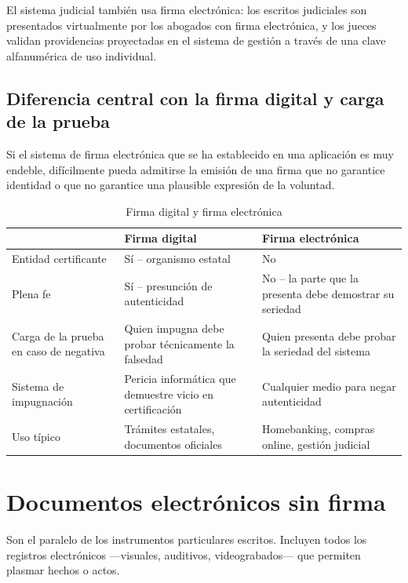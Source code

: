 \documentclass[12pt,oneside]{book}
\begin{document}
El sistema judicial también usa firma electrónica: los escritos judiciales son presentados virtualmente por los abogados con firma electrónica, y los jueces validan providencias proyectadas en el sistema de gestión a través de una clave alfanumérica de uso individual.

\subsection{Diferencia central con la firma digital y carga de la prueba}

Si el sistema de firma electrónica que se ha establecido en una aplicación es muy endeble, difícilmente pueda admitirse la emisión de una firma que no garantice identidad o que no garantice una plausible expresión de la voluntad.

\begin{table}[H]
\centering
\caption{Firma digital y firma electrónica}
\begin{tabularx}{\textwidth}{>{\raggedright\arraybackslash}p{} >{\raggedright\arraybackslash}X >{\raggedright\arraybackslash}X}
\toprule
 & \textbf{Firma digital} & \textbf{Firma electrónica} \\
\midrule
Entidad certificante & Sí -- organismo estatal & No \\
Plena fe & Sí -- presunción de autenticidad & No -- la parte que la presenta debe demostrar su seriedad \\
Carga de la prueba en caso de negativa & Quien impugna debe probar técnicamente la falsedad & Quien presenta debe probar la seriedad del sistema \\
Sistema de impugnación & Pericia informática que demuestre vicio en certificación & Cualquier medio para negar autenticidad \\
Uso típico & Trámites estatales, documentos oficiales & Homebanking, compras online, gestión judicial \\
\bottomrule
\end{tabularx}
\end{table}

\section{Documentos electrónicos sin firma}

Son el paralelo de los instrumentos particulares escritos. Incluyen todos los registros electrónicos —visuales, auditivos, videograbados— que permiten plasmar hechos o actos.
\end{document}
